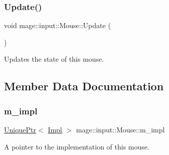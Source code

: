 \subsubsection{\texorpdfstring{Update()}{Update()}}
{\footnotesize\ttfamily void mage\+::input\+::\+Mouse\+::\+Update (\begin{DoxyParamCaption}{ }\end{DoxyParamCaption})\hspace{0.3cm}{\ttfamily [noexcept]}}

Updates the state of this mouse. 

\subsection{Member Data Documentation}
\mbox{\label{classmage_1_1input_1_1_mouse_a9056beca36df1fd7947cf7002aec99b6}} 
\subsubsection{\texorpdfstring{m\+\_\+impl}{m\_impl}}
{\footnotesize\ttfamily \mbox{\hyperlink{namespacemage_a3316d7143a973e37adf1110f2e80ca31}{Unique\+Ptr}}$<$ \mbox{\hyperlink{classmage_1_1input_1_1_mouse_1_1_impl}{Impl}} $>$ mage\+::input\+::\+Mouse\+::m\+\_\+impl\hspace{0.3cm}{\ttfamily [private]}}

A pointer to the implementation of this mouse. 